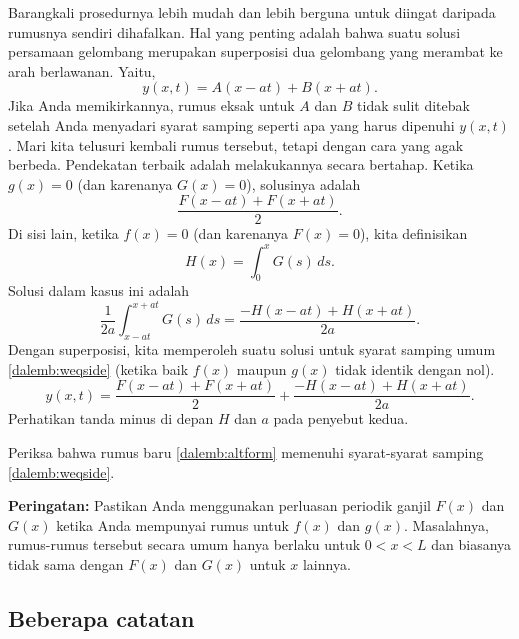 Barangkali prosedurnya lebih mudah dan lebih berguna
untuk diingat daripada rumusnya sendiri dihafalkan.
Hal yang penting adalah bahwa suatu solusi persamaan
gelombang merupakan superposisi dua gelombang yang merambat ke arah berlawanan.
Yaitu,
\begin{equation*}
y(x,t) = A(x-at) + B(x+at) .
\end{equation*}
Jika Anda memikirkannya, rumus eksak untuk $A$ dan $B$ tidak sulit
ditebak setelah Anda menyadari syarat samping seperti apa yang harus
dipenuhi $y(x,t)$.  Mari kita telusuri kembali rumus tersebut, tetapi dengan cara yang agak berbeda.
Pendekatan terbaik adalah melakukannya secara bertahap.  Ketika $g(x) = 0$ (dan karenanya
$G(x) = 0$), solusinya adalah
\begin{equation*}
\frac{ F(x-at) + F(x+at) }{2} .
\end{equation*}
Di sisi lain,
ketika $f(x) = 0$ (dan karenanya $F(x) = 0$), kita definisikan
\begin{equation*}
H(x) = \int_0^x G(s) \,ds .
\end{equation*}
Solusi dalam kasus ini adalah
\begin{equation*}
\frac{1}{2a} \int_{x-at}^{x+at} G(s) \,ds
=
\frac{ -H(x-at) + H(x+at) }{2a} .
\end{equation*}
Dengan superposisi, kita memperoleh suatu solusi untuk syarat samping umum
\eqref{dalemb:weqside} (ketika baik $f(x)$ maupun $g(x)$ tidak identik dengan nol).
\begin{equation} \label{dalemb:altform}
y(x,t) = \frac{ F(x-at) + F(x+at) }{2} +
\frac{ -H(x-at) + H(x+at) }{2a} .
\end{equation}
Perhatikan tanda minus di depan $H$ dan $a$ pada penyebut kedua.

\begin{exercise}
Periksa bahwa rumus baru \eqref{dalemb:altform} memenuhi
syarat-syarat samping
\eqref{dalemb:weqside}.
\end{exercise}

\textbf{Peringatan:}
Pastikan Anda menggunakan perluasan periodik ganjil $F(x)$ dan $G(x)$
ketika Anda mempunyai rumus untuk $f(x)$ dan $g(x)$.
Masalahnya, rumus-rumus tersebut secara umum hanya berlaku
untuk $0 < x < L$ dan biasanya tidak sama dengan $F(x)$ dan $G(x)$
untuk $x$ lainnya.

\subsection{Beberapa catatan}

